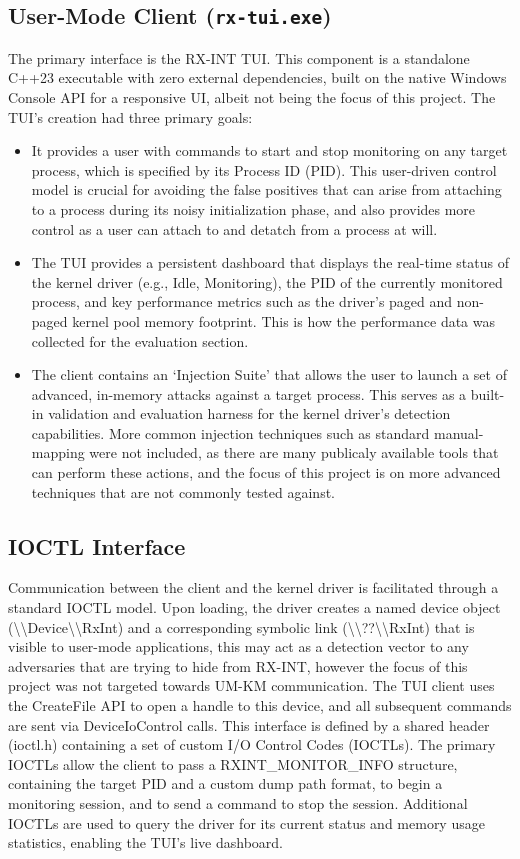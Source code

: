 \documentclass[journal]{IEEEtran}
\begin{document}
\subsection{User-Mode Client (\texttt{rx-tui.exe})}
The primary interface is the RX-INT TUI. This component is a standalone C++23 executable with zero external dependencies, built on the native Windows Console API for a responsive UI, albeit not being the focus of this project. The TUI's creation had three primary goals:
\begin{itemize}
\item It provides a user with commands to start and stop monitoring on any target process, which is specified by its Process ID (PID). This user-driven control model is crucial for avoiding the false positives that can arise from attaching to a process during its noisy initialization phase, and also provides more control as a user can attach to and detatch from a process at will.
\item The TUI provides a persistent dashboard that displays the real-time status of the kernel driver (e.g., Idle, Monitoring), the PID of the currently monitored process, and key performance metrics such as the driver's paged and non-paged kernel pool memory footprint. This is how the performance data was collected for the evaluation section.
\item The client contains an `Injection Suite' that allows the user to launch a set of advanced, in-memory attacks against a target process. This serves as a built-in validation and evaluation harness for the kernel driver's detection capabilities. More common injection techniques such as standard manual-mapping were not included, as there are many publicaly available tools that can perform these actions, and the focus of this project is on more advanced techniques that are not commonly tested against.
\end{itemize}
\subsection{IOCTL Interface}
Communication between the client and the kernel driver is facilitated through a standard IOCTL model. Upon loading, the driver creates a named device object (\textbackslash\textbackslash Device\textbackslash\textbackslash RxInt) and a corresponding symbolic link (\textbackslash\textbackslash??\textbackslash\textbackslash RxInt) that is visible to user-mode applications, this may act as a detection vector to any adversaries that are trying to hide from RX-INT, however the focus of this project was not targeted towards UM-KM communication. The TUI client uses the CreateFile API to open a handle to this device, and all subsequent commands are sent via DeviceIoControl calls.
This interface is defined by a shared header (ioctl.h) containing a set of custom I/O Control Codes (IOCTLs). The primary IOCTLs allow the client to pass a RXINT\_MONITOR\_INFO structure, containing the target PID and a custom dump path format, to begin a monitoring session, and to send a command to stop the session. Additional IOCTLs are used to query the driver for its current status and memory usage statistics, enabling the TUI's live dashboard.
\end{document}
